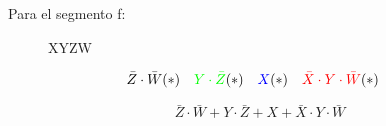 Para el segmento f:
\begin{figure}[H]
  \begin{center}
    \begin{Karnaugh}{X}{Y}{Z}{W}
    \end{Karnaugh}
  \end{center}
\end{figure}

\begin{align*}
  \bar{Z} \cdot \bar{W} & (*) &
  \color{green} Y \cdot \bar{Z} & (*) &
  \color{blue} X & (*) &
  \color{red} \bar{X} \cdot Y \cdot \bar{W} & (*)
\end{align*}

\begin{equation*}
  \bar{Z} \cdot \bar{W} +
  Y \cdot \bar{Z} +
  X +
  \bar{X} \cdot Y \cdot \bar{W}
\end{equation*}
